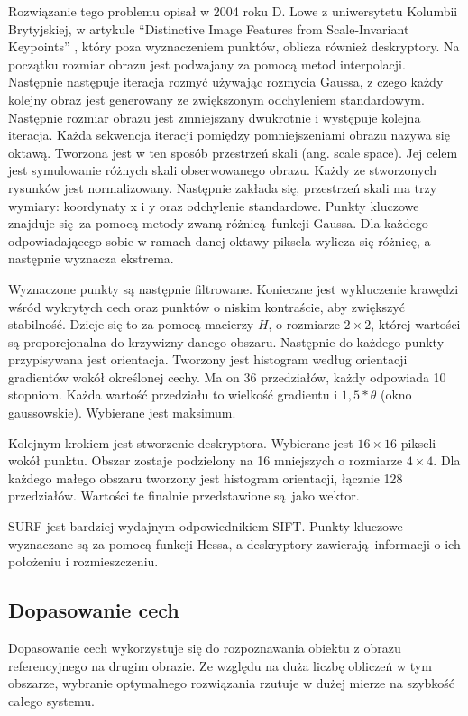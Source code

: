 \documentclass[12pt,twoside,polish]{article}
\begin{document}
Rozwiązanie tego problemu opisał w 2004 roku D. Lowe z uniwersytetu Kolumbii Brytyjskiej, w artykule \enquote{Distinctive Image Features from Scale-Invariant Keypoints} \cite{dlowe}, który poza wyznaczeniem punktów, oblicza również deskryptory. Na początku rozmiar obrazu jest podwajany za pomocą metod interpolacji. Następnie następuje iteracja rozmyć używając rozmycia Gaussa, z czego każdy kolejny obraz jest generowany ze zwiększonym odchyleniem standardowym. Następnie rozmiar obrazu jest zmniejszany dwukrotnie i występuje kolejna iteracja. Każda sekwencja iteracji pomiędzy pomniejszeniami obrazu nazywa się oktawą. Tworzona jest w ten sposób przestrzeń skali (ang. scale space). Jej celem jest symulowanie różnych skali obserwowanego obrazu. Każdy ze stworzonych rysunków jest normalizowany. Następnie zakłada się, przestrzeń skali ma trzy wymiary: koordynaty x i y oraz odchylenie standardowe. Punkty kluczowe znajduje się za pomocą metody zwaną różnicą funkcji Gaussa. Dla każdego odpowiadającego sobie w ramach danej oktawy piksela wylicza się różnicę, a następnie wyznacza ekstrema.

Wyznaczone punkty są następnie filtrowane. Konieczne jest wykluczenie krawędzi wśród wykrytych cech oraz punktów o niskim kontraście, aby zwiększyć stabilność. Dzieje się to za pomocą macierzy $H$, o rozmiarze $2 \times 2$, której wartości są proporcjonalna do krzywizny danego obszaru. Następnie do każdego punkty przypisywana jest orientacja. Tworzony jest histogram według orientacji gradientów wokół określonej cechy. Ma on 36 przedziałów, każdy odpowiada 10 stopniom. Każda wartość przedziału to wielkość gradientu i $1,5 * \theta$ (okno gaussowskie). Wybierane jest maksimum.

Kolejnym krokiem jest stworzenie deskryptora. Wybierane jest $16 \times 16$ pikseli wokół punktu. Obszar zostaje podzielony na 16 mniejszych o rozmiarze $4 \times 4$. Dla każdego małego obszaru tworzony jest histogram orientacji, łącznie 128 przedziałów. Wartości te finalnie przedstawione są jako wektor.

SURF jest bardziej wydajnym odpowiednikiem SIFT. Punkty kluczowe wyznaczane są za pomocą funkcji Hessa, a deskryptory zawierają informacji o ich położeniu i rozmieszczeniu.

\subsection{Dopasowanie cech}
Dopasowanie cech wykorzystuje się do rozpoznawania obiektu z obrazu referencyjnego na drugim obrazie. Ze względu na duża liczbę obliczeń w tym obszarze, wybranie optymalnego rozwiązania rzutuje w dużej mierze na szybkość całego systemu. 
\end{document}
